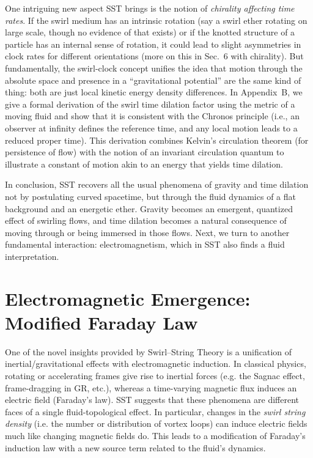 \documentclass[10pt,reprint,aps,onecolumn,nofootinbib]{revtex4-2}
\begin{document}
One intriguing new aspect SST brings is the notion of \emph{chirality affecting time rates}. If the swirl medium has an intrinsic rotation (say a swirl ether rotating on large scale, though no evidence of that exists) or if the knotted structure of a particle has an internal sense of rotation, it could lead to slight asymmetries in clock rates for different orientations (more on this in Sec.~6 with chirality). But fundamentally, the swirl-clock concept unifies the idea that motion through the absolute space and presence in a ``gravitational potential'' are the same kind of thing: both are just local kinetic energy density differences. In Appendix~B, we give a formal derivation of the swirl time dilation factor using the metric of a moving fluid and show that it is consistent with the Chronos principle (i.e., an observer at infinity defines the reference time, and any local motion leads to a reduced proper time). This derivation combines Kelvin’s circulation theorem (for persistence of flow) with the notion of an invariant circulation quantum to illustrate a constant of motion akin to an energy that yields time dilation.


In conclusion, SST recovers all the usual phenomena of gravity and time dilation not by postulating curved spacetime, but through the fluid dynamics of a flat background and an energetic ether. Gravity becomes an emergent, quantized effect of swirling flows, and time dilation becomes a natural consequence of moving through or being immersed in those flows. Next, we turn to another fundamental interaction: electromagnetism, which in SST also finds a fluid interpretation.


\section{Electromagnetic Emergence: Modified Faraday Law}

One of the novel insights provided by Swirl–String Theory is a unification of inertial/gravitational effects with electromagnetic induction. In classical physics, rotating or accelerating frames give rise to inertial forces (e.g. the Sagnac effect, frame-dragging in GR, etc.), whereas a time-varying magnetic flux induces an electric field (Faraday’s law). SST suggests that these phenomena are different faces of a single fluid-topological effect. In particular, changes in the \emph{swirl string density} (i.e. the number or distribution of vortex loops) can induce electric fields much like changing magnetic fields do. This leads to a modification of Faraday’s induction law with a new source term related to the fluid’s dynamics.
\end{document}
